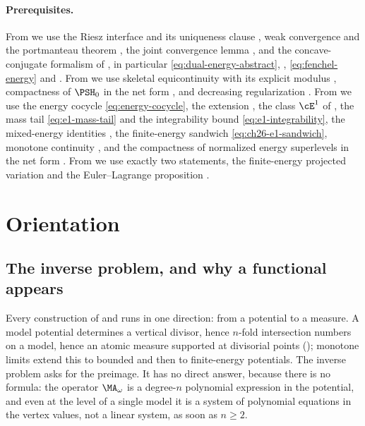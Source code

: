 \paragraph{Prerequisites.}
From  we use the Riesz interface
 and its uniqueness clause
, weak convergence and the portmanteau theorem
, the joint convergence lemma
, and the concave-conjugate formalism of
, in particular
\eqref{eq:dual-energy-abstract}, ,
\eqref{eq:fenchel-energy} and .  From
 we use skeletal equicontinuity
 with its explicit modulus
, compactness of $\PSH_0$
 in the net form
, and decreasing regularization
.  From  we
use the energy cocycle \eqref{eq:energy-cocycle}, the extension
, the class $\cE^1$ of , the
mass tail \eqref{eq:e1-mass-tail} and the integrability bound
\eqref{eq:e1-integrability}, the mixed-energy identities
, the finite-energy sandwich
\eqref{eq:ch26-e1-sandwich}, monotone continuity
, and the compactness of normalized
energy superlevels  in the net form
.  From
 we use exactly two statements, the
finite-energy projected variation  and the
Euler--Lagrange proposition .

\section{Orientation}
\label{sec:ch28-orientation}

\subsection{The inverse problem, and why a functional appears}
\label{sec:ch28-inverse}

Every construction of  and  runs in
one direction: from a potential to a measure.  A model potential determines
a vertical divisor, hence $n$-fold intersection numbers on a model, hence
an atomic measure supported at divisorial points
(); monotone limits extend this to bounded and
then to finite-energy potentials.  The inverse problem asks for the
preimage.  It has no direct answer, because there is no formula: the
operator $\MA_\omega$ is a degree-$n$ polynomial expression in the
potential, and even at the level of a single model it is a system of
polynomial equations in the vertex values, not a linear system, as soon as
$n\geq2$.

